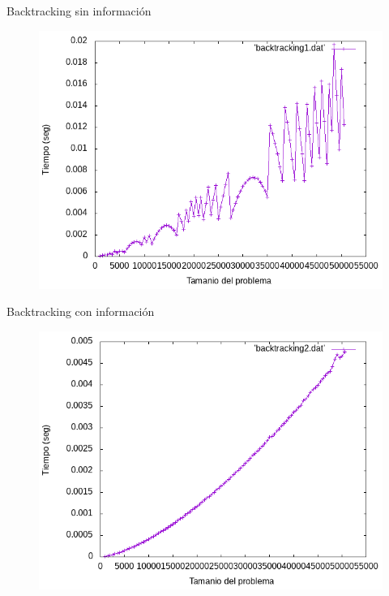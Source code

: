 \documentclass{beamer}
\begin{document}
\begin{frame}[fragile]{Backtracking sin información}
\begin{figure}[H]
\centering
\includegraphics[scale=0.5]{backtracking1.png}
\end{figure}
\end{frame}

\begin{frame}[fragile]{Backtracking con información}
\begin{figure}[H]
\centering
\includegraphics[scale=0.5]{backtracking2.png}
\end{figure}
\end{frame}
\end{document}
